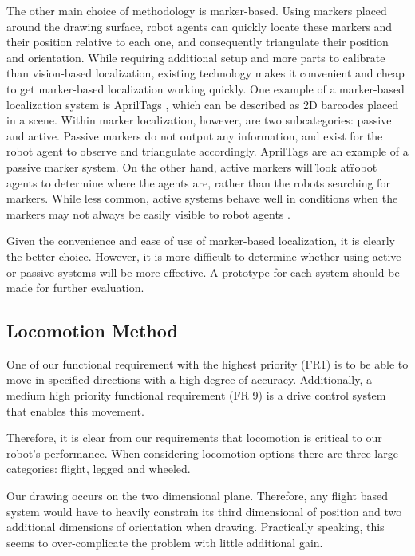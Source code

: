 The other main choice of methodology is marker-based. Using markers placed around the drawing surface, robot agents can quickly locate these markers and their position relative to each one, and consequently triangulate their position and orientation. While requiring additional setup and more parts to calibrate than vision-based localization, existing technology makes it convenient and cheap to get marker-based localization working quickly. One example of a marker-based localization system is AprilTags \cite{olson2011apriltag}, which can be described as 2D barcodes placed in a scene. Within marker localization, however, are two subcategories: passive and active. Passive markers do not output any information, and exist for the robot agent to observe and triangulate accordingly. AprilTags are an example of a passive marker system. On the other hand, active markers will \"look at\" robot agents to determine where the agents are, rather than the robots searching for markers. While less common, active systems behave well in conditions when the markers may not always be easily visible to robot agents \cite{cassinis2005active}.

Given the convenience and ease of use of marker-based localization, it is clearly the better choice. However, it is more difficult to determine whether using active or passive systems will be more effective. A prototype for each system should be made for further evaluation.

\subsection{Locomotion Method}
\label{sec:trade_locomotion}
One of our functional requirement with the highest priority (FR1) is to be able to move in specified directions with a high degree of accuracy.  Additionally, a medium high priority functional requirement (FR 9) is a drive control system that enables this movement. 

Therefore, it is clear from our requirements that locomotion is critical to our robot's performance. When considering locomotion options there are three large categories: flight, legged and wheeled. 

Our drawing occurs on the two dimensional plane. Therefore, any flight based system would have to heavily constrain its third dimensional of position and two additional dimensions of orientation when drawing. Practically speaking, this seems to over-complicate the problem with little additional gain. 


